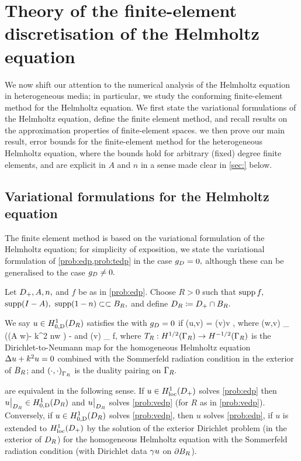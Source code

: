 \section{Theory of the finite-element discretisation of the Helmholtz equation}\label{sec:helmfe}

We now shift our attention to the numerical analysis of the Helmholtz equation in heterogeneous media; in particular, we  study the conforming finite-element method for the Helmholtz equation. We first state the variational formulations of the Helmholtz equation, define the finite element method, and recall results on the approximation properties of finite-element spaces. we then prove our main result, error bounds for the finite-element method for the heterogeneous Helmholtz equation, where the bounds hold for arbitrary (fixed) degree finite elements, and are explicit in $A$ and $n$ in a sense made clear in \cref{sec:} below.

  \subsection{Variational formulations for the Helmholtz equation}\label{sec:varform}
  The finite element method is based on the variational formulation of the Helmholtz equation; for simplicity of exposition, we state the variational formulation of \cref{prob:edp,prob:tedp} in the case $g_{D} = 0,$ although these can be generalised to the case $g_{D} \neq 0.$
  
\bprob[Variational formulation of EDP when $\gD = 0$]\label{prob:vedp}
Let $D_{+}, A, n,$ and $f$ be as in \cref{prob:edp}. Choose $R>0$ such that $\operatorname{supp} f,$ $\operatorname{supp}(I-A),$ $\operatorname{supp}(1-n) \subset\subset B_{R},$ and define $D_{R} \coloneqq D_{+} \cap B_{R}.$

We say $u \in \HozDDR$ satisfies the  with $\gD = 0$ if
\beqs
\aE(u,v) = \FE(v)\quad \tfa v \in \HozDDR,
\eeqs
where
\beq\label{eq:aedp}
\aE(w,v) \de \int_{\DR} \mleft(\mleft(A \grad w\mright)\cdot\grad \vbar - k^2 n\minispace w \vbar\mright) - 
\eeq
and
\beq\label{eq:Ledp}
\FE(v) \de \int_{\DR} f\minispace\vbar,
\eeq
where $\DtN:\HhGR\rightarrow \HmhGR$ is the Dirichlet-to-Neumann map for the homogeneous Helmholtz equation $\Delta u + k^2 u = 0$ combined with the Sommerfeld radiation condition in the exterior of $B_{R}$; and $\DPGR{\cdot}{\cdot}$ is the duality pairing on $\Gamma_{R}.$
\eprob

\label{lem:edpform}
 are equivalent in the following sense. If $u \in \HolocDp$ solves \cref{prob:edp} then $u\restrict_{\DR} \in \HozDDR$ and $u\big|_{D_{R}}$ solves \cref{prob:vedp}  (for $R$ as in \cref{prob:vedp}). Conversely, if $u \in \HozDDR$ solves \cref{prob:vedp}, then $u$ solves \cref{prob:edp}, if $u$ is extended to $\HolocDp$ by the solution of the exterior Dirichlet problem (in the exterior of $D_{R}$) for the homogeneous Helmholtz equation with the Sommerfeld radiation condition (with Dirichlet data $\gamma u$ on $\partial B_{R}$).
\ele

